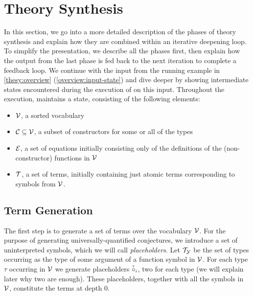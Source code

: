 \section{Theory Synthesis}
\label{thesy:technical}

In this section, we go into a more detailed description of the phases of theory synthesis and explain how they are combined within an iterative deepening loop.
To simplify the presentation, we describe all the phases first, then explain how
the output from the last phase is fed back to the next iteration to complete a
feedback loop.
We continue with the input from the running example in \autoref{thesy:overview} (\autoref{overview:input-state}) and dive deeper by showing intermediate states encountered during the execution of \TheSy on this input.
Throughout the execution, \TheSy maintains a state, consisting of the following elements:
\begin{itemize}
  \item $\mathcal{V}$, a sorted vocabulary 
  \item $\mathcal{C}\subseteq\mathcal{V}$, a subset of constructors for some or all of the types
  \item $\mathcal{E}$, a set of equations initially consisting only of the
    definitions of the (non-constructor) functions in $\mathcal{V}$
  \item $\mathcal{T}$, a set of terms, initially containing just atomic terms corresponding to symbols from $\mathcal{V}$.
\end{itemize}


\subsection{Term Generation}
\label{overview:term-generation}

The first step is to generate a set of terms over the vocabulary $\mathcal{V}$.
For the purpose of generating universally-quantified conjectures, we introduce a set of uninterpreted symbols, which we will call \emph{placeholders}.
Let $\mathcal{T_Y}$ be the set of types occurring as the type of some argument of a function symbol in $\mathcal{V}$.
For each type $\tau$ occurring in $\mathcal{V}$ we generate placeholders $\pholder{i}{\tau~}$, two for each type (we will explain later why two are enough).
These placeholders, together with all the symbols in $\mathcal{V}$, constitute the terms at depth $0$.

